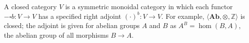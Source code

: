 A closed category $V$ is a symmetric monoidal category in which each functor $- \square b : V \rightarrow V$ has a specified right adjoint $(\cdot)^b : V \rightarrow V$. For example, $\langle \mathbf{Ab}, \otimes, \mathbb{Z} \rangle$ is closed; the adjoint is given for abelian groups $A$ and $B$ as $A^B = \hom(B, A)$, the abelian group of all morphisms $B \rightarrow A$.
